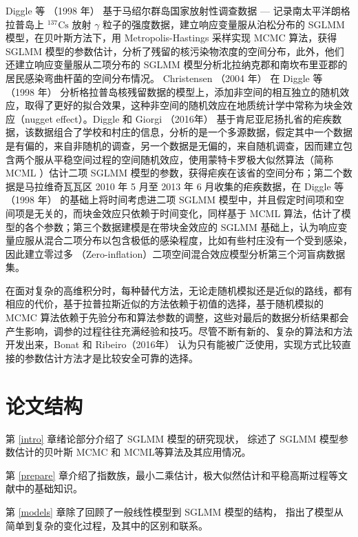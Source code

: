 \documentclass[12pt,a4paper,UTF8,twoside]{book}
\theoremstyle{definition}
\theoremstyle{definition}
\theoremstyle{definition}
\theoremstyle{remark}
\begin{document}
Diggle 等 （1998 年） \citep{Diggle1998}基于马绍尔群岛国家放射性调查数据 --- 记录南太平洋朗格拉普岛上 \({}^{137}\mathrm{Cs}\) 放射 \(\gamma\) 粒子的强度数据，建立响应变量服从泊松分布的 SGLMM 模型，在贝叶斯方法下，用 Metropolis-Hastings 采样实现 MCMC 算法，获得 SGLMM 模型的参数估计，分析了残留的核污染物浓度的空间分布，此外，他们还建立响应变量服从二项分布的 SGLMM 模型分析北拉纳克郡和南坎布里亚郡的居民感染弯曲杆菌的空间分布情况。 Christensen （2004 年） \citep{Christensen2004} 在 Diggle 等 （1998 年） \citep{Diggle1998} 分析格拉普岛核残留数据的模型上，添加非空间的相互独立的随机效应，取得了更好的拟合效果，这种非空间的随机效应在地质统计学中常称为块金效应（nugget effect）。Diggle 和 Giorgi （2016年） \citep{Diggle2016} 基于肯尼亚尼扬扎省的疟疾数据，该数据组合了学校和村庄的信息，分析的是一个多源数据，假定其中一个数据是有偏的，来自非随机的调查，另一个数据是无偏的，来自随机调查，因而建立包含两个服从平稳空间过程的空间随机效应，使用蒙特卡罗极大似然算法（简称 MCML ）估计二项 SGLMM 模型的参数，获得疟疾在该省的空间分布；第二个数据是马拉维奇瓦瓦区 2010 年 5 月至 2013 年 6 月收集的疟疾数据，在 Diggle 等 （1998 年） \citep{Diggle1998}的基础上将时间考虑进二项 SGLMM 模型中，并且假定时间项和空间项是无关的，而块金效应只依赖于时间变化，同样基于 MCML 算法，估计了模型的各个参数；第三个数据建模是在带块金效应的 SGLMM 基础上，认为响应变量应服从混合二项分布以包含极低的感染程度，比如有些村庄没有一个受到感染，因此建立零过多 （Zero-inflation）二项空间混合效应模型分析第三个河盲病数据集。

在面对复杂的高维积分时，每种替代方法，无论走随机模拟还是近似的路线，都有相应的代价，基于拉普拉斯近似的方法依赖于初值的选择，基于随机模拟的 MCMC 算法依赖于先验分布和算法参数的调整，这些对最后的数据分析结果都会产生影响，调参的过程往往充满经验和技巧。尽管不断有新的、复杂的算法和方法开发出来，Bonat 和 Ribeiro（2016年） \citep{Bonat2016Practical} 认为只有能被广泛使用，实现方式比较直接的参数估计方法才是比较安全可靠的选择。

\hypertarget{stracture}{%
\section{论文结构}\label{stracture}}

第 \ref{intro} 章绪论部分介绍了 SGLMM 模型的研究现状， 综述了 SGLMM 模型参数估计的贝叶斯 MCMC 和 MCML等算法及其应用情况。

第 \ref{prepare} 章介绍了指数族，最小二乘估计，极大似然估计和平稳高斯过程等文献中的基础知识。

第 \ref{models} 章除了回顾了一般线性模型到 SGLMM 模型的结构， 指出了模型从简单到复杂的变化过程，及其中的区别和联系。
\end{document}
